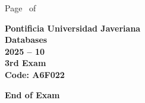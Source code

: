 \documentclass[11pt, addpoints]{exam}\usepackage[utf8]{inputenc}
\begin{document}
\begin{coverpages}
\begin{center}
			\vspace{3mm}
			\leavevmode \hspace{5mm} 
		\end{center}
	\end{coverpages}

	\footer{} {Page \thepage\ of \numpages} {}

	\centering
	\textbf{\Large Pontificia Universidad Javeriana}\\
	\textbf{\Large Databases} \\
	\textbf{\large 2025 -- 10} \\
	\textbf{\large 3rd Exam} \\
	\textbf{Code: A6F022}


	\begin{questions}
		
		
		
		
		
		
		
		
		
		
		
		
		
		
		
		
		
		
		
		
	\end{questions}

	\vspace{5mm}
	\noindent \textbf{End of Exam}
\end{document}
